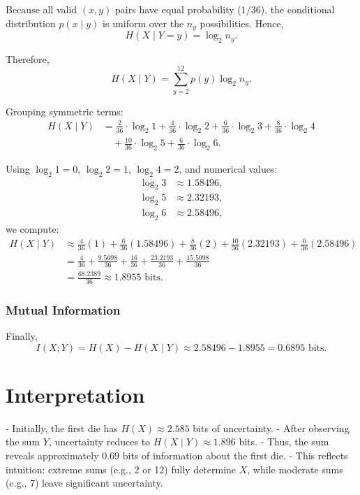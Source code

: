 \documentclass{article}
\begin{document}
Because all valid \((x,y)\) pairs have equal probability (\(1/36\)), the conditional distribution \(p(x \mid y)\) is uniform over the \(n_y\) possibilities. Hence,
\[
H(X \mid Y = y) = \log_2 n_y.
\]

Therefore,
\[
H(X \mid Y) = \sum_{y=2}^{12} p(y) \log_2 n_y.
\]

Grouping symmetric terms:
\[
\begin{aligned}
H(X \mid Y) &= \frac{2}{36} \cdot \log_2 1 
+ \frac{4}{36} \cdot \log_2 2 
+ \frac{6}{36} \cdot \log_2 3 
+ \frac{8}{36} \cdot \log_2 4 \\
&\quad + \frac{10}{36} \cdot \log_2 5 
+ \frac{6}{36} \cdot \log_2 6.
\end{aligned}
\]

Using \(\log_2 1 = 0\), \(\log_2 2 = 1\), \(\log_2 4 = 2\), and numerical values:
\[
\begin{aligned}
\log_2 3 &\approx 1.58496, \\
\log_2 5 &\approx 2.32193, \\
\log_2 6 &\approx 2.58496,
\end{aligned}
\]
we compute:
\[
\begin{aligned}
H(X \mid Y) &\approx 
\frac{4}{36}(1) 
+ \frac{6}{36}(1.58496) 
+ \frac{8}{36}(2) 
+ \frac{10}{36}(2.32193) 
+ \frac{6}{36}(2.58496) \\
&= \frac{4}{36} + \frac{9.5098}{36} + \frac{16}{36} + \frac{23.2193}{36} + \frac{15.5098}{36} \\
&= \frac{68.2389}{36} \approx 1.8955 \text{ bits}.
\end{aligned}
\]

\subsubsection*{Mutual Information}

Finally,
\[
I(X;Y) = H(X) - H(X \mid Y) \approx 2.58496 - 1.8955 = \boxed{0.6895 \text{ bits}}.
\]

\section*{Interpretation}

- Initially, the first die has \(H(X) \approx 2.585\) bits of uncertainty.
- After observing the sum \(Y\), uncertainty reduces to \(H(X \mid Y) \approx 1.896\) bits.
- Thus, the sum reveals approximately \(0.69\) bits of information about the first die.
- This reflects intuition: extreme sums (e.g., 2 or 12) fully determine \(X\), while moderate sums (e.g., 7) leave significant uncertainty.
\end{document}
